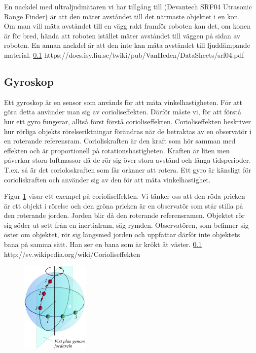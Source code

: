 \documentclass[a4paper,12pt,fleqn]{article}
\begin{document}
En nackdel med ultraljudmätaren vi har tillgång till (Devantech SRF04 Utrasonic Range Finder) är att den mäter avståndet till det närmaste objektet i en kon. Om man vill mäta avståndet till en vägg rakt framför roboten kan det, om konen är för bred, hända att roboten istället mäter avståndet till väggen på sidan av roboten. En annan nackdel är att den inte kan mäta avståndet till ljuddämpande material.
\ref{} https://docs.isy.liu.se/twiki/pub/VanHeden/DataSheets/srf04.pdf


\subsection{Gyroskop}
Ett gyroskop är en sensor som används för att mäta vinkelhastigheten. För att göra detta använder man sig av corioliseffekten. Därför måste vi, för att förstå hur ett gyro fungerar, alltså först förstå corioliseffekten. Corioliseffekten beskriver hur rörliga objekts rörelseriktningar förändras när de betraktas av en observatör i en roterande referensram. Corioliskraften är den kraft som hör samman med effekten och är proportionell på rotationshastigheten. Kraften är liten men påverkar stora luftmassor då de rör sig över stora avstånd och långa tidsperioder. T.ex. så är det corioloskraften som får orkaner att rotera. Ett gyro är känsligt för corioliskraften och använder sig av den för att mäta vinkelhastighet.

Figur \ref{fig:jord} visar ett exempel på corioliseffekten. Vi tänker oss att den röda pricken är ett objekt i rörelse och den gröna pricken är en observatör som står stilla på den roterande jorden. Jorden blir då den roterande referensramen. Objektet rör sig söder ut sett från en inertialram, säg rymden. Observatören, som befinner sig öster om objektet, rör sig längsmed jorden och uppfattar därför inte objektets bana på samma sätt. Han ser en bana som är krökt åt väster.
\ref{} http://sv.wikipedia.org/wiki/Corioliseffekten


\begin{figure}[h]
\label{fig:jord}
\caption{}
\includegraphics[width=0.3\textwidth]
{Coriolisjord.png}
\end{figure}
\end{document}

